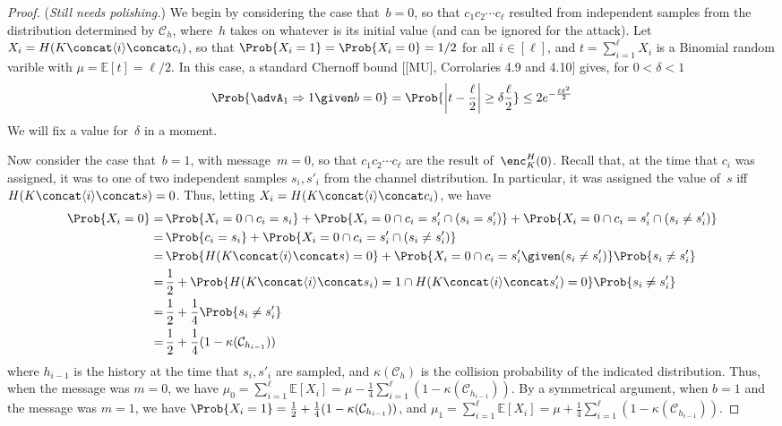 \begin{proof}(\textit{Still needs polishing.})
We begin by considering the case that~$b=0$, so that $c_1 c_2 \cdots c_\ell$ resulted from
independent samples from the distribution determined by
$\mathcal{C}_h$, where~$h$ takes on whatever is its initial value (and
can be ignored for the attack).  Let $X_i = H(K \concat \langle i
\rangle \concat c_i)$, so that $\Prob{X_i = 1}=\Prob{X_i=0}=1/2$ for
all $i \in [\ell]$, and $t = \sum_{i=1}^{\ell} X_i$ is a Binomial
random varible with $\mu=\mathbb{E}[t]=\ell/2$.  In this case, a standard Chernoff
bound [[MU], Corrolaries 4.9 and 4.10] gives, for $0 < \delta < 1$
\[
\Prob{\advA_1 \Rightarrow 1 \given b=0} = \Prob{\left| t - \frac{\ell}{2} \right| \geq \delta \frac{\ell}{2}} \leq 2e^{-\frac{\ell\delta^2}{2}}
\]
We will fix a value for~$\delta$ in a moment.

Now consider the case that~$b=1$, with message~$m=0$, so that $c_1 c_2 \cdots c_\ell$ are
the result of~$\enc^H_K(0)$.  Recall that, at the time that $c_i$ was
assigned, it was to one of two independent samples $s_i,s'_i$ from the
channel distribution.  In particular, it was assigned the value of~$s$
iff $H(K \concat \langle i \rangle \concat s)=0$.  Thus, letting $X_i = H(K
\concat \langle i \rangle \concat c_i)$, we have 
\begin{align*}
\Prob{X_i=0} =& 
\, \Prob{X_i=0 \cap c_i=s_i} + \Prob{X_i=0 \cap c_i=s'_i \cap (s_i=s'_i)} + 
    \Prob{X_i=0 \cap c_i=s'_i \cap (s_i \neq s'_i)}\\
=&\,  \Prob{c_i=s_i} + \Prob{X_i=0 \cap c_i=s'_i \cap (s_i \neq s'_i)}\\
=&\, \Prob{H(K \concat \langle i \rangle \concat s)=0} 
    + \Prob{X_i=0 \cap c_i=s'_i \given (s_i \neq s'_i)}\Prob{s_i \neq s'_i}\\
=&\, \frac{1}{2} + \Prob{H(K \concat \langle i \rangle \concat s_i)=1 \cap H(K
  \concat \langle i \rangle \concat s'_i)=0} \Prob{s_i \neq s'_i} \\
=&\, \frac{1}{2} + \frac{1}{4} \Prob{s_i \neq s'_i} \\
=&\, \frac{1}{2} + \frac{1}{4} (1-\kappa(\mathcal{C}_{h_{i-1}}))
\end{align*}
where $h_{i-1}$ is the history at the time that $s_i,s'_i$ are
sampled, and $\kappa(\mathcal{C}_h)$ is the collision probability
of the indicated distribution.  Thus, when the message was $m=0$, we have 
$
\mu_0=\sum_{i=1}^{\ell}
\mathbb{E}[X_i] = \mu - \frac{1}{4}\sum_{i=1}^{\ell}(1-\kappa(\mathcal{C}_{h_{i-1}}))
$.  
By a symmetrical argument, when $b=1$ and the message was $m=1$, we have
$\Prob{X_i=1} = \frac{1}{2} + \frac{1}{4}
(1-\kappa(\mathcal{C}_{h_{i-1}}))$, and $
\mu_1=\sum_{i=1}^{\ell}
\mathbb{E}[X_i] = \mu + \frac{1}{4}\sum_{i=1}^{\ell}(1-\kappa(\mathcal{C}_{h_{i-1}}))
$.  


\end{proof}
